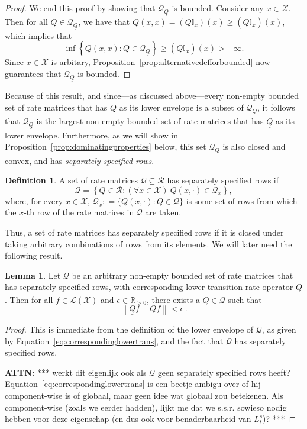 \documentclass[10pt]{paper}
\theoremstyle{definition}
\newtheorem{lemma}[theorem]{Lemma}
\newtheorem{definition}{Definition}
\newcommand{\reals}{\mathbb{R}}
\newcommand{\realspos}{\reals_{>0}}
\newcommand{\states}{\mathcal{X}}
\newcommand{\gambles}{\mathcal{L}}
\newcommand{\gamblesX}{\gambles(\states)}
\newcommand{\ind}[1]{\mathbb{I}_{#1}}
\newcommand{\rateset}{\mathcal{Q}}
\newcommand{\lrate}{\underline{Q}}
\newcommand{\norm}[1]{\left\lVert #1 \right\rVert}
\newcommand{\coloneqq}{:\!=}
\begin{document}
\begin{proof}
We end this proof by showing that $\rateset_{\lrate}$ is bounded. Consider any $x\in\states$. Then for all $Q\in\rateset_{\lrate}$, we have that $Q(x,x)=(Q\ind{x})(x)\geq(\lrate\ind{x})(x)$, which implies that
\begin{equation*}
\inf\left\{Q(x,x)\colon Q\in\rateset_{\lrate}\right\}\geq(\lrate\ind{x})(x)>-\infty.
\end{equation*}
Since $x\in\states$ is arbitary, Proposition~\ref{prop:alternativedefforbounded} now guarantees that $\rateset_{\lrate}$ is bounded. 
\end{proof}

\noindent
Because of this result, and since---as discussed above---every non-empty bounded set of rate matrices that has $\lrate$ as its lower envelope is a subset of $\rateset_{\lrate}$, it follows that $\rateset_{\lrate}$ is the largest non-empty bounded set of rate matrices that has $\lrate$ as its lower envelope.
Furthermore, as we will show in Proposition~\ref{prop:dominatingproperties} below, this set $\rateset_{\lrate}$ is also closed and convex, and has \emph{separately specified rows}.

\begin{definition}
A set of rate matrices $\rateset\subseteq\mathcal{R}$ has separately specified rows if
\begin{equation*}
\rateset=\left\{
Q\in\mathcal{R}
\colon
(\forall x\in\states)~Q(x,\cdot)\in\rateset_x\right\},
\end{equation*}
where, for every $x\in\states$, $\rateset_x\coloneqq\{Q(x,\cdot)\colon Q\in\rateset\}$ is some set of rows from which the $x$-th row of the rate matrices in $\rateset$ are taken.
\end{definition}
Thus, a set of rate matrices has separately specified rows if it is closed under taking arbitrary combinations of rows from its elements. We will later need the following result.
\begin{lemma}\label{lemma:rateset_has_arginf}
Let $\rateset$ be an arbitrary non-empty bounded set of rate matrices that has separately specified rows, with corresponding lower transition rate operator $\lrate$. Then for all $f\in\gamblesX$ and $\epsilon\in\realspos$, there exists a $Q\in\rateset$ such that
\begin{equation*}
\norm{\lrate f - Qf} < \epsilon\,.
\end{equation*}
\end{lemma}
\begin{proof}
This is immediate from the definition of the lower envelope of $\rateset$, as given by Equation~\eqref{eq:correspondinglowertrans}, and the fact that $\rateset$ has separately specified rows.

{\bf ATTN:} *** werkt dit eigenlijk ook als $\rateset$ geen separately specified rows heeft? Equation~\eqref{eq:correspondinglowertrans} is een beetje ambigu over of hij component-wise is of globaal, maar geen idee wat globaal zou betekenen. Als component-wise (zoals we eerder hadden), lijkt me dat we s.s.r. sowieso nodig hebben voor deze eigenschap (en dus ook voor benaderbaarheid van $L_t^s$)? ***
\end{proof}
\end{document}
